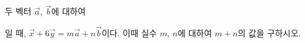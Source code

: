 두 벡터 $\vec{a}$, $\vec{b}$에 대하여 \par\smallskip{}\par\smallskip\noindent 일 때, $\vec{x}+6\vec{y}=m\vec{a}+n\vec{b}$이다. 이때 실수 $m$, $n$에 대하여 $m+n$의 값을 구하시오.
